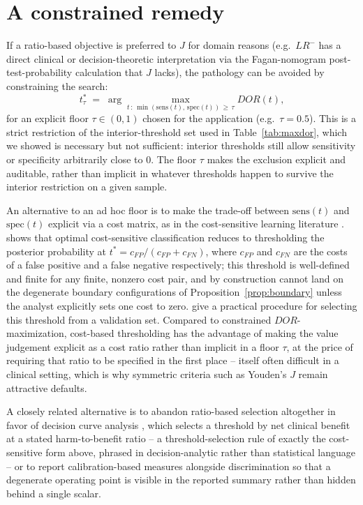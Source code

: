 \documentclass[11pt]{article}
\begin{document}
\section{A constrained remedy}
\label{sec:remedy}

If a ratio-based objective is preferred to $J$ for domain reasons (e.g.\
$LR^-$ has a direct clinical or decision-theoretic interpretation via the
Fagan-nomogram post-test-probability calculation \citep{fagan1975} that $J$
lacks), the pathology can be avoided by constraining the search:
\begin{equation}
t^\ast_\tau \;=\; \arg\max_{t \,:\, \min(\mathrm{sens}(t),\, \mathrm{spec}(t))\, \geq\, \tau} DOR(t),
\end{equation}
for an explicit floor $\tau \in (0, 1)$ chosen for the application (e.g.\
$\tau = 0.5$). This is a strict restriction of the interior-threshold set
used in Table~\ref{tab:maxdor}, which we showed is necessary but not
sufficient: interior thresholds still allow sensitivity or specificity
arbitrarily close to $0$. The floor $\tau$ makes the exclusion explicit and
auditable, rather than implicit in whatever thresholds happen to survive
the interior restriction on a given sample.

An alternative to an ad hoc floor is to make the trade-off between
$\mathrm{sens}(t)$ and $\mathrm{spec}(t)$ explicit via a cost matrix, as in
the cost-sensitive learning literature \citep{elkan2001,sheng2006}.
\citet{elkan2001} shows that optimal cost-sensitive classification reduces
to thresholding the posterior probability at
$t^\ast = c_{FP}/(c_{FP}+c_{FN})$, where $c_{FP}$ and $c_{FN}$ are the
costs of a false positive and a false negative respectively; this
threshold is well-defined and finite for any finite, nonzero cost pair, and
by construction cannot land on the degenerate boundary configurations of
Proposition~\ref{prop:boundary} unless the analyst explicitly sets one cost
to zero. \citet{sheng2006} give a practical procedure for selecting this
threshold from a validation set. Compared to constrained $DOR$-maximization,
cost-based thresholding has the advantage of making the value judgement
explicit as a cost ratio rather than implicit in a floor $\tau$, at the
price of requiring that ratio to be specified in the first place -- itself
often difficult in a clinical setting, which is why symmetric criteria
such as Youden's $J$ remain attractive defaults.

A closely related alternative is to abandon ratio-based selection altogether
in favor of decision curve analysis \citep{vickers2006}, which selects a
threshold by net clinical benefit at a stated harm-to-benefit ratio -- a
threshold-selection rule of exactly the cost-sensitive form above, phrased
in decision-analytic rather than statistical language -- or to report
calibration-based measures alongside discrimination
\citep{vancalster2019,gneiting2007,steyerberg2010} so that a degenerate
operating point is visible in the reported summary rather than hidden
behind a single scalar.
\end{document}
